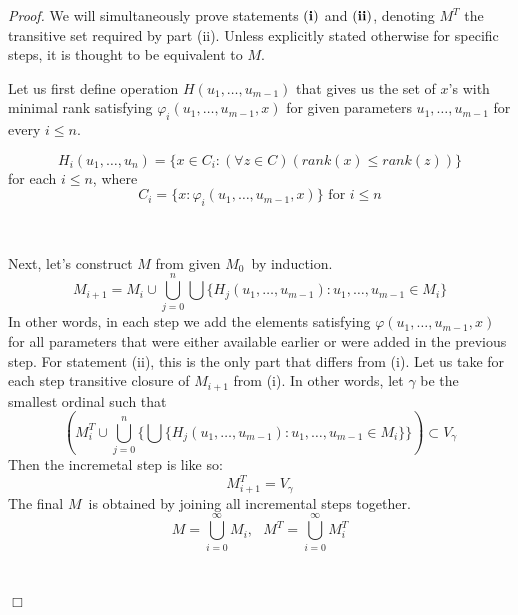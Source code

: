 \documentclass[12pt,a4paper]{article}
\newenvironment{proof}
{\noindent \textit{Proof.}}
{\hspace*{\fill} $\Box$}
\begin{document}
\begin{proof}
We will simultaneously prove statements $\bold{(i)}$ and $\bold{(ii)}$, denoting $M^T$ the transitive set required by part (ii). Unless explicitly stated otherwise for specific steps, it is thought to be equivalent to $M$.

Let us first define operation $H(u_1, \ldots, u_{m-1})$ that gives us the set of $x$'s with minimal rank satisfying $\varphi_i(u_1, \ldots, u_{m-1}, x)$ for given parameters $u_1, \ldots, u_{m-1}$ for every $i \leq n$.

\begin{equation}
H_i(u_1, \ldots, u_n) = \{x \in C_i: (\forall z \in C)(rank(x) \leq rank(z))\}
\end{equation}
for each $i \leq n$, where
\begin{equation}
C_i = \{x: \varphi_i(u_1, \ldots, u_{m-1}, x)\} \mbox{ for $i \leq n$}
\end{equation}

\

Next, let's construct $M$ from given $M_0$ by induction. 
\begin{equation}
M_{i+1} = M_i \cup \bigcup_{j=0}^{n} \bigcup \{H_j(u_1, \ldots, u_{m-1}): u_1, \ldots, u_{m-1} \in M_i\}
\end{equation}
In other words, in each step we add the elements satisfying $\varphi(u_1, \ldots, u_{m-1}, x)$ for all parameters that were either available earlier or were added in the previous step. 
For statement (ii), this is the only part that differs from (i). Let us take for each step transitive closure of $M_{i+1}$ from (i). In other words, let $\gamma$ be the smallest ordinal such that 
\begin{equation}
(M^T_i \cup \bigcup_{j=0}^{n} \{\bigcup\{H_j(u_1, \ldots, u_{m-1}): u_1, \ldots, u_{m-1} \in M_i\}\}) \subset V_\gamma
\end{equation}
Then the incremetal step is like so:
\begin{equation}
M^T_{i+1} = V_\gamma
\end{equation}
The final $M$ is obtained by joining all incremental steps together. 
\begin{equation}
M = \bigcup_{i=0}^{\infty} M_i, \mbox{  }M^T = \bigcup_{i=0}^{\infty} M^T_i
\end{equation}

\


\end{proof}
\end{document}
